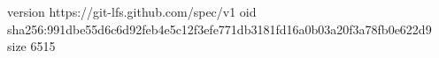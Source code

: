 version https://git-lfs.github.com/spec/v1
oid sha256:991dbe55d6c6d92feb4e5c12f3efe771db3181fd16a0b03a20f3a78fb0e622d9
size 6515
